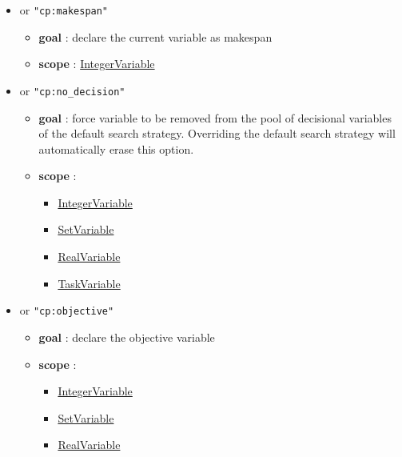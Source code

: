 \begin{itemize}
\begin{itemize}
		\end{itemize}
		\item \label{vmakespan:vmakespanoptions}\hypertarget{vmakespan:vmakespanoptions}{}
		 or \texttt{"cp:makespan"}
		\begin{itemize}
				\item \textbf{goal} : declare the current variable as makespan
				\item \textbf{scope} : \hyperlink{integervariable}{IntegerVariable}
		\end{itemize}		
		\item \label{vnodecision:vnodecisionoptions}\hypertarget{vnodecision:vnodecisionoptions}{}
		 or \texttt{"cp:no\_decision"}
		\begin{itemize}
				\item \textbf{goal} : force variable to be removed from the pool of decisional variables of the default search strategy. Overriding the default search strategy will automatically erase this option.
				\item \textbf{scope} : 
					\begin{itemize} 
						\item \hyperlink{integervariable}{IntegerVariable}
						\item \hyperlink{setvariable}{SetVariable}
						\item \hyperlink{realvariable}{RealVariable}
						\item \hyperlink{taskvariable}{TaskVariable}
					\end{itemize}				
		\end{itemize}			
		\item \label{vobjective:vobjectiveoptions}\hypertarget{vobjective:vobjectiveoptions}{}
		 or \texttt{"cp:objective"}
		\begin{itemize}
				\item \textbf{goal} : declare the objective variable
				\item \textbf{scope} : 
					\begin{itemize} 
						\item \hyperlink{integervariable}{IntegerVariable}
						\item \hyperlink{setvariable}{SetVariable}
						\item \hyperlink{realvariable}{RealVariable}
					\end{itemize}				
		\end{itemize}
	\end{itemize}		
	
